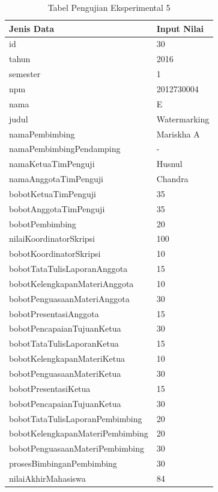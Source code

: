 	\begin{table}[H]
		\centering
		\caption{Tabel Pengujian Eksperimental 5}
		\begin{tabular}{| m{7cm} | m{5cm} |}
			\hline
			Jenis Data & Input Nilai\\
			\hline
			id & 30\\
			\hline
			tahun & 2016\\
			\hline
			semester & 1\\
			\hline
			npm & 2012730004\\
			\hline
			nama & E\\
			\hline
			judul & Watermarking\\
			\hline
			namaPembimbing & Mariskha A\\
			\hline
			namaPembimbingPendamping & -\\
			\hline
			namaKetuaTimPenguji & Husnul\\
			\hline
			namaAnggotaTimPenguji & Chandra\\
			\hline
			bobotKetuaTimPenguji & 35\\
			\hline
			bobotAnggotaTimPenguji & 35\\
			\hline
			bobotPembimbing & 20\\
			\hline
			nilaiKoordinatorSkripsi & 100\\
			\hline
			bobotKoordinatorSkripsi & 10\\
			\hline
			bobotTataTulisLaporanAnggota & 15\\
			\hline
			bobotKelengkapanMateriAnggota & 10\\
			\hline
			bobotPenguasaanMateriAnggota & 30\\
			\hline
			bobotPresentasiAnggota & 15\\
			\hline
			bobotPencapaianTujuanKetua & 30\\
			\hline
			bobotTataTulisLaporanKetua & 15\\
			\hline
			bobotKelengkapanMateriKetua & 10\\
			\hline
			bobotPenguasaanMateriKetua & 30\\
			\hline
			bobotPresentasiKetua & 15\\
			\hline
			bobotPencapaianTujuanKetua & 30\\
			\hline
			bobotTataTulisLaporanPembimbing & 20\\
			\hline
			bobotKelengkapanMateriPembimbing &20\\
			\hline
			bobotPenguasaanMateriPembimbing & 30\\
			\hline
			prosesBimbinganPembimbing & 30\\
			\hline
			nilaiAkhirMahasiswa & 84\\
			\hline
		\end{tabular}
	\end{table}
		
